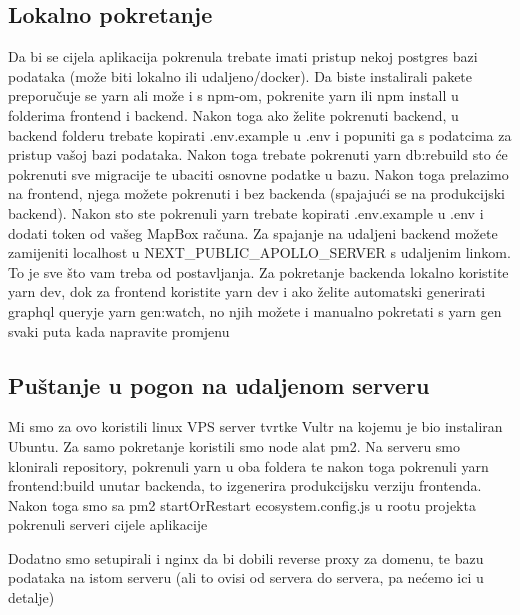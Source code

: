 			\subsection{Lokalno pokretanje}
				Da bi se cijela aplikacija pokrenula trebate imati pristup nekoj postgres bazi 
				podataka (može biti lokalno ili udaljeno/docker). Da biste instalirali pakete 
				preporučuje se yarn ali može i s npm-om, pokrenite yarn ili npm install u folderima 
				frontend i backend. Nakon toga ako želite pokrenuti backend, u backend folderu 
				trebate kopirati .env.example u .env i popuniti ga s podatcima za pristup vašoj 
				bazi podataka. Nakon toga trebate pokrenuti yarn db:rebuild sto će pokrenuti sve 
				migracije te ubaciti osnovne podatke u bazu. 
				Nakon toga prelazimo na frontend, njega možete pokrenuti i bez backenda 
				(spajajući se na produkcijski backend). Nakon sto ste pokrenuli yarn trebate kopirati 
				.env.example u .env i dodati token od vašeg MapBox računa. Za spajanje na udaljeni 
				backend možete zamijeniti localhost u NEXT\_PUBLIC\_APOLLO\_SERVER s udaljenim linkom. 
				To je sve što vam treba od postavljanja.
				Za pokretanje backenda lokalno koristite yarn dev, dok za frontend 
				koristite yarn dev i ako želite automatski generirati graphql queryje yarn gen:watch, 
				no njih možete i manualno pokretati s yarn gen svaki puta kada napravite promjenu
			
			\subsection{Puštanje u pogon na udaljenom serveru}
			Mi smo za ovo koristili linux VPS server tvrtke Vultr na kojemu je bio instaliran Ubuntu. Za samo pokretanje koristili smo node alat pm2. Na serveru smo klonirali repository, pokrenuli yarn u oba foldera te nakon toga pokrenuli yarn frontend:build unutar backenda, to izgenerira produkcijsku verziju frontenda. Nakon toga smo sa pm2 startOrRestart ecosystem.config.js u rootu projekta pokrenuli serveri cijele aplikacije

			Dodatno smo setupirali i nginx da bi dobili reverse proxy za domenu, te bazu podataka na istom serveru (ali to ovisi od servera do servera, pa nećemo ici u detalje)
			
			\eject 
